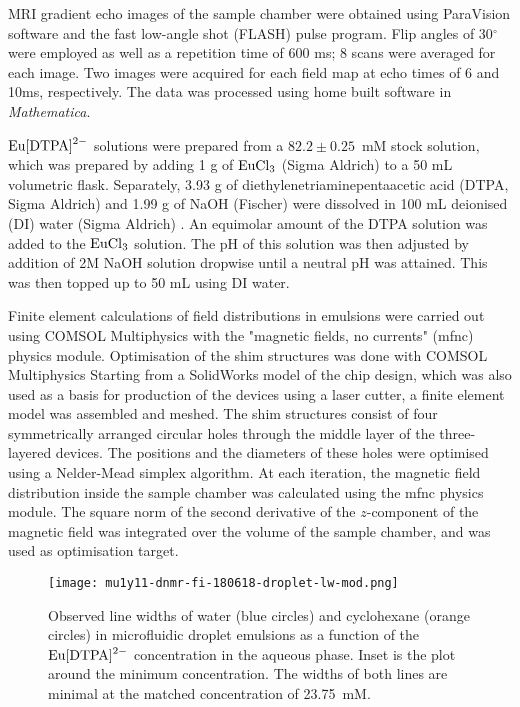 MRI gradient echo images of the sample chamber were obtained using ParaVision software and the fast low-angle shot (FLASH) pulse program. Flip angles of 30$^\circ$ were employed as well as a repetition time of 600 ms; 8 scans were averaged for each image. Two images were acquired for each field map at echo times of 6 and 10ms, respectively. The data was processed using home built software in \textit{Mathematica}.

$\ce{Eu[DTPA]^{2-}}$ solutions were prepared  from a $82.2\pm0.25$~mM
stock solution, which was prepared by adding 1 g of $\ce{EuCl_3}$
(Sigma Aldrich) to a 50 mL volumetric flask. Separately,
3.93 g of diethylenetriaminepentaacetic acid (DTPA, Sigma Aldrich)
and 1.99 g of NaOH (Fischer) were dissolved in 100 mL deionised (DI) water (Sigma Aldrich) .
An equimolar amount of the DTPA solution was added to the $\ce{EuCl_3}$ solution. The pH of this solution was then adjusted by addition of 2M NaOH solution dropwise until a neutral pH was attained.
This was then topped up to 50 mL using DI water.

Finite element calculations of field distributions in emulsions
 were carried out using COMSOL Multiphysics with the "magnetic fields, no currents" (mfnc) physics module.
Optimisation of the shim structures was done with COMSOL Multiphysics\citep{comsolmp} Starting from a SolidWorks model
of the chip design, which was also used as a basis for production of the devices using
a laser cutter, a finite element model was assembled and meshed. The shim structures consist
of four symmetrically arranged circular holes through the middle layer of the three-layered
devices. The positions and the diameters of these
holes were optimised using a Nelder-Mead simplex algorithm. At each iteration, the magnetic
field distribution inside the sample chamber was calculated using the mfnc physics module.
The square norm of the second derivative of the $z$-component of the magnetic field was integrated
over the volume of the sample chamber, and was used as optimisation target.

\begin{figure}
  \begin{center}
    \texttt{[image: mu1y11-dnmr-fi-180618-droplet-lw-mod.png]}
  \end{center}
  \caption{Observed line widths of water (blue circles) and
    cyclohexane (orange circles) in microfluidic droplet emulsions
    as a function of the $\ce{Eu[DTPA]^{2-}}$ concentration in the aqueous phase. Inset is the plot around the minimum
    concentration.
    The widths of both lines are minimal
    at the matched concentration of 23.75~mM. }
    \label{fig:linewidths}
\end{figure}


